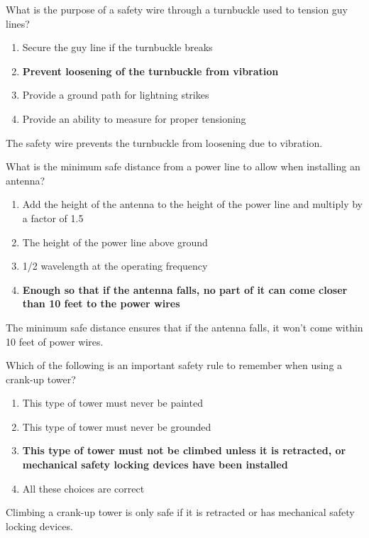 \begin{tcolorbox}[colback=gray!10!white,colframe=black!75!black,title={T0B05}]
What is the purpose of a safety wire through a turnbuckle used to tension guy lines?
\begin{enumerate}[label=\Alph*),noitemsep]
    \item Secure the guy line if the turnbuckle breaks
    \item \textbf{Prevent loosening of the turnbuckle from vibration}
    \item Provide a ground path for lightning strikes
    \item Provide an ability to measure for proper tensioning
\end{enumerate}
\end{tcolorbox}
The safety wire prevents the turnbuckle from loosening due to vibration.

\begin{tcolorbox}[colback=gray!10!white,colframe=black!75!black,title={T0B06}]
What is the minimum safe distance from a power line to allow when installing an antenna?
\begin{enumerate}[label=\Alph*),noitemsep]
    \item Add the height of the antenna to the height of the power line and multiply by a factor of 1.5
    \item The height of the power line above ground
    \item 1/2 wavelength at the operating frequency
    \item \textbf{Enough so that if the antenna falls, no part of it can come closer than 10 feet to the power wires}
\end{enumerate}
\end{tcolorbox}
The minimum safe distance ensures that if the antenna falls, it won’t come within 10 feet of power wires.

\begin{tcolorbox}[colback=gray!10!white,colframe=black!75!black,title={T0B07}]
Which of the following is an important safety rule to remember when using a crank-up tower?
\begin{enumerate}[label=\Alph*),noitemsep]
    \item This type of tower must never be painted
    \item This type of tower must never be grounded
    \item \textbf{This type of tower must not be climbed unless it is retracted, or mechanical safety locking devices have been installed}
    \item All these choices are correct
\end{enumerate}
\end{tcolorbox}
Climbing a crank-up tower is only safe if it is retracted or has mechanical safety locking devices.

